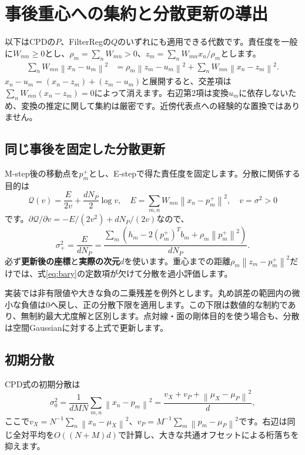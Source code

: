 \documentclass[a4paper,11pt]{article}
\newcommand{\norm}[1]{\left\lVert#1\right\rVert}
\numberwithin{equation}{section}
\begin{document}
\section{事後重心への集約と分散更新の導出}\label{sec:variance}
以下はCPDの\(P\)、FilterRegの\(Q\)のいずれにも適用できる代数です。責任度を一般に\(W_{mn}\geq0\)とし、\(\rho_m=\sum_nW_{mn}>0\)、\(z_m=\sum_nW_{mn}x_n/\rho_m\)とします。
\begin{align}
 \sum_nW_{mn}\norm{x_n-u_m}^2
 &=\rho_m\norm{z_m-u_m}^2
   +\sum_nW_{mn}\norm{x_n-z_m}^2.\label{eq:bary}
\end{align}
\(x_n-u_m=(x_n-z_m)+(z_m-u_m)\)と展開すると、交差項は
\(\sum_nW_{mn}(x_n-z_m)=0\)によって消えます。右辺第2項は変換\(u_m\)に依存しないため、変換の推定に関して集約は厳密です。近傍代表点への経験的な置換ではありません。\cite[§3.3]{acpd}

\subsection{同じ事後を固定した分散更新}
M-step後の移動点を\(p_m^+\)とし、E-stepで得た責任度を固定します。分散に関係する目的は
\begin{equation}
 \mathcal Q(v)=\frac{E}{2v}+\frac{dN_P}{2}\log v,
 \quad E=\sum_{m,n}W_{mn}\norm{x_n-p_m^+}^2,
 \quad v=\sigma^2>0
\end{equation}
です。\(\partial\mathcal Q/\partial v=-E/(2v^2)+dN_P/(2v)\)なので、
\begin{equation}
 \sigma_+^2=\frac{E}{dN_P}
 =\frac{\sum_m\left(h_m-2(p_m^+)^Tb_m+\rho_m\norm{p_m^+}^2\right)}{dN_P}.\label{eq:variance}
\end{equation}
必ず\textbf{更新後の座標}と\textbf{実際の次元\(d\)}を使います。重心までの距離\(\rho_m\norm{z_m-p_m^+}^2\)だけでは、式\eqref{eq:bary}の定数項が欠けて分散を過小評価します。\cite[式(25)--(27)]{acpd}

実装では非有限値や大きな負の二乗残差を例外とします。丸め誤差の範囲内の微小な負値は0へ戻し、正の分散下限を適用します。この下限は数値的な制約であり、無制約最大尤度解と区別します。点対線・面の剛体目的を使う場合も、分散は空間Gaussianに対する上式で更新します。

\subsection{初期分散}
CPD式の初期分散は
\begin{equation}
 \sigma_0^2=\frac{1}{dMN}\sum_{m,n}\norm{x_n-p_m}^2
 =\frac{v_X+v_P+\norm{\mu_X-\mu_P}^2}{d},
\end{equation}
ここで\(v_X=N^{-1}\sum_n\norm{x_n-\mu_X}^2\)、\(v_P=M^{-1}\sum_m\norm{p_m-\mu_P}^2\)です。右辺は同じ全対平均を\(O((N+M)d)\)で計算し、大きな共通オフセットによる桁落ちを抑えます。
\end{document}
